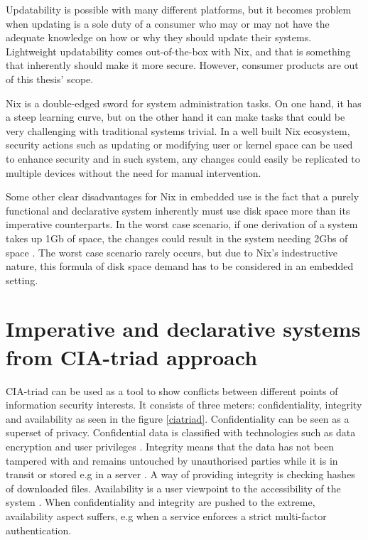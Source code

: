 Updatability is possible with many different platforms, but it  becomes
problem when updating is a sole duty of a consumer who may or may not
have the adequate knowledge on how or why they should update their
systems. Lightweight updatability comes out-of-the-box with Nix, and
that is something that inherently should make it more secure. However, consumer
products are out of this thesis' scope.

Nix is a double-edged sword for system administration tasks. On one
hand, it has a steep learning curve, but on the other hand it can make
tasks that could be very challenging with traditional systems
trivial. In a well built Nix ecosystem, security actions such as
updating or modifying user or kernel space can be used to enhance
security and in such system, any changes could easily be replicated to
multiple devices without the need for manual intervention.

Some other clear disadvantages for Nix in embedded use is the fact
that a purely functional and declarative system inherently must use disk
space more than its imperative counterparts. In the worst case
scenario, if one derivation of a system takes up 1Gb of space, the changes could result in the system needing 2Gbs of space \cite{dolstra2007purely}. The
worst case scenario rarely occurs, but due to Nix's indestructive
nature, this formula of disk space demand has to be considered in an
embedded setting. 

\section{Imperative and declarative systems from CIA-triad approach} \label{imperativeanddeclarative}

CIA-triad can be used as a tool to show conflicts between different
points of information security interests. It consists of three meters:
confidentiality, integrity and availability as seen in the figure
\ref{ciatriad}. Confidentiality can be seen as a superset of
privacy. Confidential data is classified with technologies such as
data encryption and user privileges \cite{pender2019parkerian}. Integrity means that the data has
not been tampered with and remains untouched by unauthorised parties
while it is in transit or stored e.g in a server \cite{pender2019parkerian}. A way of providing
integrity is checking hashes of downloaded files. Availability is a
user viewpoint to the accessibility of the system \cite{pender2019parkerian}. When
confidentiality and integrity are pushed to the extreme, availability
aspect suffers, e.g when a service enforces a strict multi-factor
authentication. 

